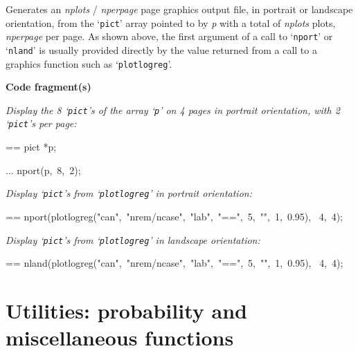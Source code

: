 \documentclass{book}
\makeatletter
\newcommand\Texinfocommandstyletextvar[1]{{\normalfont{}\textsl{#1}}}%
\newenvironment{Texinfopreformatted}{%
  \par\GNUTobeylines\obeyspaces\frenchspacing\parskip=\z@\parindent=\z@}{}
{\catcode`\^^M=13 \gdef\GNUTobeylines{\catcode`\^^M=13 \def^^M{\null\par}}}
\newenvironment{Texinfoindented}{\begin{list}{}{}\item\relax}{\end{list}}
\renewcommand{\_}{\Texinfounderscore\discretionary{}{}{}}
\makeatother
\begin{document}
Generates an \Texinfocommandstyletextvar{nplots} / \Texinfocommandstyletextvar{nperpage} page graphics output file,
in portrait or landscape orientation, from the `\texttt{pict}' array pointed to by
\Texinfocommandstyletextvar{p} with a total of \Texinfocommandstyletextvar{nplots} plots, \Texinfocommandstyletextvar{nperpage} per page.
As shown above, the first argument of a call to `\texttt{nport}' or
`\texttt{nland}' is usually provided directly by the value returned
from a call to a graphics function such as `\texttt{plotlogreg}'.

\noindent{}\textbf{Code fragment(s)}

\emph{Display the 8 `\texttt{pict}'s of the array `\texttt{p}' on
4 pages in portrait orientation, with 2 `\texttt{pict}'s per page:}
\begin{Texinfoindented}
\begin{Texinfopreformatted}%
\ttfamily pict *p;

...
nport(p,\ 8,\ 2);
\end{Texinfopreformatted}
\end{Texinfoindented}

\emph{Display `\texttt{pict}'s from `\texttt{plotlogreg}' in portrait orientation:}
\begin{Texinfoindented}
\begin{Texinfopreformatted}%
\ttfamily nport(plotlogreg("can",\ "nrem/ncase",\ "lab",\ "==",\ 5,\ "",\ 1,\ 0.95),
\      4,\ 4);
\end{Texinfopreformatted}
\end{Texinfoindented}

\emph{Display `\texttt{pict}'s from `\texttt{plotlogreg}' in landscape orientation:}
\begin{Texinfoindented}
\begin{Texinfopreformatted}%
\ttfamily nland(plotlogreg("can",\ "nrem/ncase",\ "lab",\ "==",\ 5,\ "",\ 1,\ 0.95),
\      4,\ 4);
\end{Texinfopreformatted}
\end{Texinfoindented}
%
%
%
%
%

\chapter{{Utilities: probability and miscellaneous functions}}
\label{anchor:Utilities}%
\end{document}

